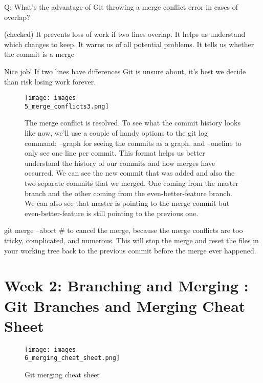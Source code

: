 \documentclass[11pt, onecolumn]{article}
\begin{document}
Q: What's the advantage of Git throwing a merge conflict error in cases of overlap?

(checked) It prevents loss of work if two lines overlap.
It helps us understand which changes to keep.
It warns us of all potential problems.
It tells us whether the commit is a merge

Nice job! If two lines have differences Git is unsure about, it's best we decide than risk losing work forever.

\begin{figure}[h]
\begin{center}
\texttt{[image: images\\5\_merge\_conflicts3.png]}
\end{center}
\caption{The merge conflict is resolved. To see what the commit history looks like now, we'll use a couple of handy options to the git log command; --graph for seeing the commits as a graph, and --oneline to only see one line per commit. This format helps us better understand the history of our commits and how merges have occurred. We can see the new commit that was added and also the two separate commits that we merged.
One coming from the master branch and the other coming from the even-better-feature branch. We can also see that master is pointing to the merge commit but even-better-feature is still pointing to the previous one. }
\label{5_merge_conflicts3}
\end{figure}

git merge --abort  # to cancel the merge, because the merge conflicts are too tricky, complicated, and numerous. This will stop the merge and reset the files in your working tree back to the previous commit before the merge ever happened. 

\section{Week 2: Branching and Merging : Git Branches and Merging Cheat Sheet}
\begin{figure}[h]
\begin{center}
\texttt{[image: images\\6\_merging\_cheat\_sheet.png]}
\end{center}
\caption{Git merging cheat sheet}
\label{6_merging_cheat_sheet}
\end{figure}
\end{document}
